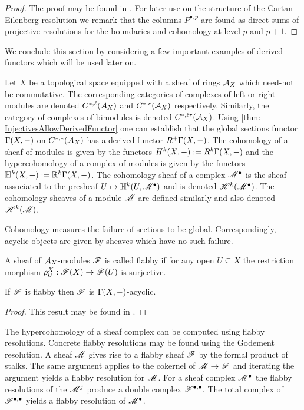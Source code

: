 \begin{proof}
  The proof may be found in \cite[Chapter 5]{weibel1995introduction}.
  For later use on the structure of the Cartan-Eilenberg resolution we remark that the columns $P^{\bullet,p}$ are found as direct sums of projective resolutions for the boundaries and cohomology at level $p$ and $p+1$.
\end{proof}

We conclude this section by considering a few important examples of derived functors which will be used later on.

Let $X$ be a topological space equipped with a sheaf of rings $\AA_X$ which need-not be commutative.
The corresponding categories of complexes of left or right modules are denoted $C^{*,\ell}(\AA_X)$ and $C^{*,r}(\AA_X)$ respectively.
Similarly, the category of complexes of bimodules is denoted $C^{*,\ell r}(\AA_X)$.
Using \cref{thm: InjectivesAllowDerivedFunctor} one can establish that the global sections functor $\Gamma(X,\blank)$ on $C^{*,*}(\AA_X)$ has a derived functor $R^+\Gamma(X,\blank)$.
The cohomology of a sheaf of modules is given by the functors $H^k(X,\blank) := R^k \Gamma(X,\blank)$ and the hypercohomology of a complex of modules is given by the functors $\mathbb{H}^k(X,\blank):= \mathbb{R}^k\Gamma(X,\blank)$.
The cohomology sheaf of a complex $\M^\bullet$ is the sheaf associated to the presheaf $U\mapsto \mathbb{H}^k(U,\M^\bullet)$ and is denoted $\H^k(\M^\bullet)$.
The cohomology sheaves of a module $\M$ are defined similarly and also denoted $\H^k(\M)$.

Cohomology measures the failure of sections to be global.
Correspondingly, acyclic objects are given by sheaves which have no such failure.
\begin{definition}
 A sheaf of $\AA_X$-modules $\F$ is called flabby if for any open $U\subseteq X$ the restriction morphism $\rho_U^X:\F(X)\to\F(U) $ is surjective.
\end{definition}
\begin{proposition}
 If $\F$ is flabby then $\F$ is $\Gamma(X,\blank)$-acyclic.
\end{proposition}
\begin{proof}
  This result may be found in \cite[Chapter 2]{dimca2004sheaves}.
\end{proof}
The hypercohomology of a sheaf complex can be computed using flabby resolutions.
Concrete flabby resolutions may be found using the Godement resolution.
A sheaf $\M$ gives rise to a flabby sheaf $\F$ by the formal product of stalks.
The same argument applies to the cokernel of $\M\to \F$ and iterating the argument yields a flabby resolution for $\M$.
For a sheaf complex $\M^\bullet$ the flabby resolutions of the $\M^{j}$ produce a double complex $\F^{\bullet,\bullet}$.
The total complex of $\F^{\bullet, \bullet}$ yields a flabby resolution of $\M^\bullet$.

